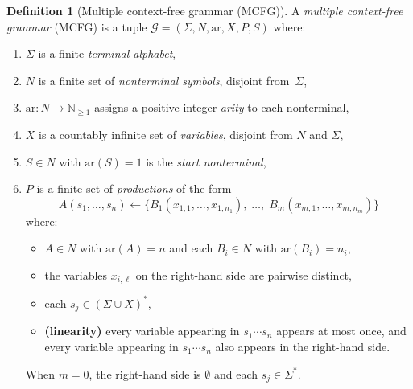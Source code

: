 \documentclass[11pt,a4paper]{article}
\theoremstyle{plain}
\theoremstyle{definition}
\newtheorem{definition}[theorem]{Definition}
\theoremstyle{remark}
\begin{document}
\begin{definition}[Multiple context-free grammar (MCFG)]\label{def:mcfg}
A \emph{multiple context-free grammar} (MCFG) is a tuple $\mathcal{G} = (\Sigma, N, \mathrm{ar}, X, P, S)$ where:
\begin{enumerate}[nosep,label=(\roman*)]
  \item $\Sigma$ is a finite \emph{terminal alphabet},
  \item $N$ is a finite set of \emph{nonterminal symbols}, disjoint from~$\Sigma$,
  \item $\mathrm{ar}\colon N \to \mathbb{N}_{\geq 1}$ assigns a positive integer \emph{arity} to each nonterminal,
  \item $X$ is a countably infinite set of \emph{variables}, disjoint from $N$ and $\Sigma$,
  \item $S \in N$ with $\mathrm{ar}(S) = 1$ is the \emph{start nonterminal},
  \item $P$ is a finite set of \emph{productions} of the form
\begin{equation}\label{eq:mcfg-prod}
  A(s_1, \ldots, s_n) \leftarrow \{B_1(x_{1,1}, \ldots, x_{1,n_1}),\; \ldots,\; B_m(x_{m,1}, \ldots, x_{m,n_m})\}
\end{equation}
where:
  \begin{itemize}[nosep]
    \item $A \in N$ with $\mathrm{ar}(A) = n$ and each $B_i \in N$ with $\mathrm{ar}(B_i) = n_i$,
    \item the variables $x_{i,\ell}$ on the right-hand side are pairwise distinct,
    \item each $s_j \in (\Sigma \cup X)^*$,
    \item \textbf{(linearity)} every variable appearing in $s_1 \cdots s_n$ appears at most once, and every variable appearing in $s_1 \cdots s_n$ also appears in the right-hand side.
  \end{itemize}
When $m = 0$, the right-hand side is $\emptyset$ and each $s_j \in \Sigma^*$.
\end{enumerate}
\end{definition}
\end{document}
